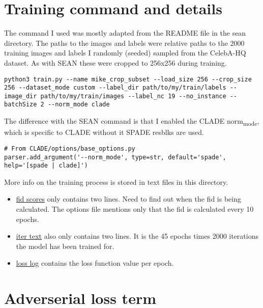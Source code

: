 \documentclass{memoir}
\author{Mike Vink}
\date{\today}
\title{}
\begin{document}
\tableofcontents

\chapter{Training command and details}
\label{sec:orgb649fee}

The command I used was mostly adapted from the README file in the sean
directory. The paths to the images and labels were relative paths to the 2000
training images and labels I randomly (seeded) sampled from the CelebA-HQ
dataset. As with SEAN these were cropped to 256x256 during training.

\begin{verbatim}
python3 train.py --name mike_crop_subset --load_size 256 --crop_size 256 --dataset_mode custom --label_dir path/to/my/train/labels --image_dir path/to/my/train/images --label_nc 19 --no_instance --batchSize 2 --norm_mode clade
\end{verbatim}

The difference with the SEAN command is that I enabled the CLADE norm\textsubscript{mode}, which is specific to CLADE without it SPADE resblks are used.

\begin{verbatim}
# From CLADE/options/base_options.py
parser.add_argument('--norm_mode', type=str, default='spade', help='[spade | clade]')
\end{verbatim}

More info on the training process is stored in text files in this directory.

\begin{itemize}
\item \href{fid.txt}{fid scores} only contains two lines. Need to find out when the fid is being
calculated. The options file mentions only that the fid is calculated every 10 epochs.
\item \href{iter.txt}{iter text} also only contains two lines. It is the 45 epochs times 2000
iterations the model has been trained for.
\item \href{loss\_log.txt}{loss log} contains the loss function value per epoch.
\end{itemize}


\chapter{Adverserial loss term}
\label{sec:orgcb7febc}
\end{document}
